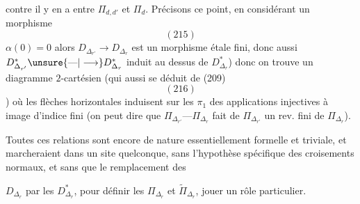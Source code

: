 contre il y en a entre $\Pi_{d,d'}$ et $\Pi_d$.
Précisons ce point, en considérant un
morphisme
\[
(215)
\]
 $\alpha(0)=0$
alors $D_{\Delta_{r'}}\longrightarrow D_{\Delta_r}$ est un morphisme
étale fini, donc aussi $D^*_{\Delta_{r'}}\unsure{\text{---}|\longrightarrow}D^*_{\Delta_r}$ induit
au dessus de $D^*_{\Delta_r}$) donc on trouve
un diagramme $2$-cartésien (qui 
 aussi se déduit de (209)
\[
(216)
\]
)
où les flèches horizontales induisent sur
les $\pi_1$ des applications injectives à
image d'indice fini (on peut dire que
$\Pi_{\Delta_{r'}}\text{---}\Pi_{\Delta_r}$ fait de $\Pi_{\Delta_{r'}}$ un
rev. fini de $\Pi_{\Delta_r}$).

Toutes ces relations sont encore de
nature essentiellement formelle et triviale,
et marcheraient dans un site quelconque,
sans l'hypothèse spécifique des croisements
normaux, et sans que le remplacement des

$D_{\Delta_r}$ par les $D^*_{\Delta_r}$, pour définir les
$\Pi_{\Delta_r}$ et $\widetilde\Pi_{\Delta_r}$, 
jouer un rôle particulier.

